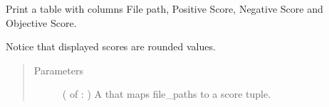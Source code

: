 \documentclass[letterpaper,10pt,english]{sphinxmanual}
\begin{document}
\label{\detokenize{utils:module-loacore.utils.file_writer}}\label{\detokenize{utils:module-loacore.utils.plot_polarities}}

\begin{fulllineitems}
\label{\detokenize{utils:loacore.utils.plot_polarities.print_polarity_table}}
Print a table with columns File path, Positive Score, Negative Score and Objective Score.

Notice that displayed scores are rounded values.
\begin{quote}\begin{description}
\item[{Parameters}] \leavevmode
{} ( of  : ) \textendash{} A  that maps file\_paths to a score tuple.

\end{description}\end{quote}

\end{fulllineitems}

\end{document}
